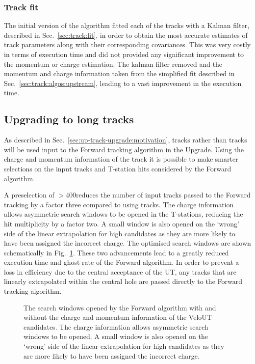 \subsubsection{Track fit}

The initial version of the \velout algorithm fitted each of the \velout tracks with a Kalman filter, described in Sec.~\ref{sec:track:fit}, in order to obtain the most accurate estimates of track parameters along with their corresponding covariances. This was very costly in terms of execution time and did not provided any significant improvement to the momentum or charge estimation. The kalman filter removed and the momentum and charge information taken from the simplified fit described in Sec.~\ref{sec:track:algos:upstream}, leading to a vast improvement in the execution time.

\subsection{Upgrading to long tracks}

As described in Sec.~\ref{sec:up-track-upgrade:motivation}, \velout tracks rather than \velo tracks will be used input to the Forward tracking algorithm in the \lhcb Upgrade. Using the charge and momentum information of the \velout track it is possible to make smarter selections on the input tracks and T-station hits considered by the Forward algorithm. 

A preselection of \pt $>400$\mevc reduces the number of input tracks passed to the Forward tracking by a factor three compared to using \velo tracks. The charge information allows asymmetric search windows to be opened in the T-stations, reducing the hit multiplicity by a factor two. A small window is also opened on the `wrong' side of the linear extrapolation for high \pt candidates as they are more likely to have been assigned the incorrect charge. The optimised search windows are shown schematically in Fig.~\ref{fig:searchwindow}. These two advancements lead to a greatly reduced execution time and ghost rate of the Forward algorithm. In order to prevent a loss in efficiency due to the central acceptance of the UT, any \velo tracks that are linearly extrapolated within the central hole are passed directly to the Forward tracking algorithm.

\begin{figure}[!tb]

\caption{The search windows opened by the Forward algorithm with and without the charge and momentum information of the VeloUT candidates. The charge information allows asymmetric search windows to be opened. A small window is also opened on the `wrong' side of the linear extrapolation for high \pt candidates as they are more likely to have been assigned the incorrect charge.}
\label{fig:searchwindow}
\end{figure}


